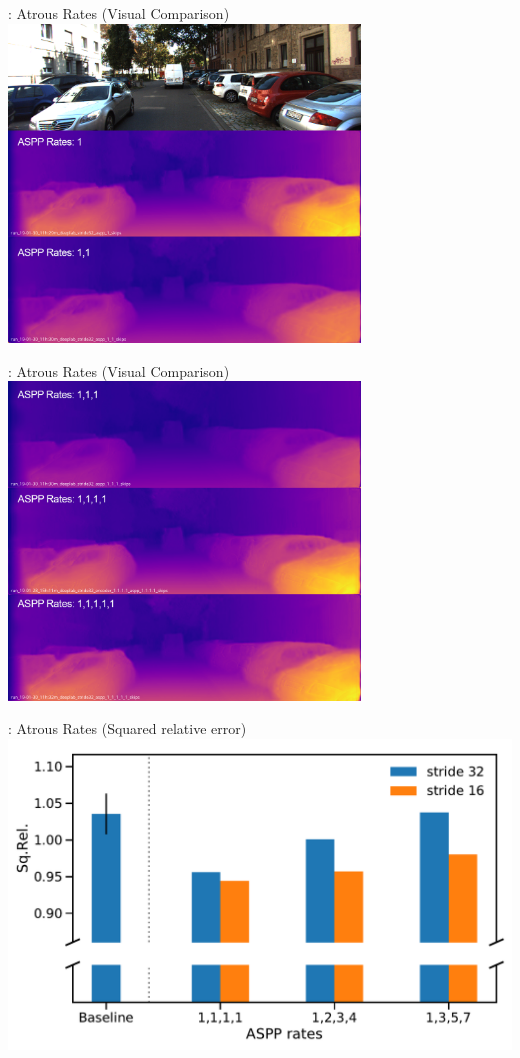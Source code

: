 \begin{frame}[c]{\subsecname: Atrous Rates (Visual Comparison)}
  \centering
  \includegraphics[width=0.7\textwidth]{figures/images/asppconvcomparison_001.png}
\end{frame}

\begin{frame}[c]{\subsecname: Atrous Rates (Visual Comparison)}
  \centering
  \includegraphics[width=0.7\textwidth]{figures/images/asppconvcomparison_002.png}
\end{frame}



\begin{frame}[c]{\subsecname: Atrous Rates (Squared relative error)}
  \centering
  \includegraphics[width=1.0\textwidth]{figures/results/experiment1_SqRel.pdf}
\end{frame}


